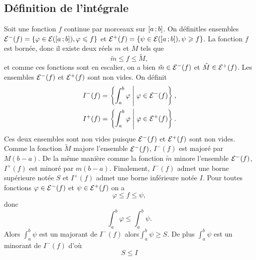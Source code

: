 \subsection{Définition de l'intégrale}

Soit une fonction \(f\) continue par morceaux sur \(\left[ a \, ;  b \right]\). On définitles ensembles \(\mathcal{E}^{-}(f)=\{\varphi \in \mathcal{E}(\left[ a \, ;  b \right]), \varphi \leqslant f\}\) et \(\mathcal{E}^{+}(f)=\{\psi \in \mathcal{E}(\left[ a \, ;  b \right]), \psi \geqslant f\}\). La fonction \(f\) est bornée, donc il existe deux réels \(m\) et \(M\) tels que 
\begin{equation}
  \tilde{m} \leqslant f \leqslant \tilde{M},
\end{equation}
et comme ces fonctions sont en escalier, on a bien \(\tilde{m} \in \mathcal{E}^{-}(f)\) et \(\tilde{M} \in \mathcal{E}^{+}(f)\). Les ensembles \(\mathcal{E}^{-}(f)\) et \(\mathcal{E}^{+}(f)\) sont non vides. On définit 
\begin{align}
I^{-}(f)=\left\{\int_a^b \varphi\mathrel{}\middle|\mathrel{}\varphi \in \mathcal{E}^{-}(f)\right\}, \\
I^{+}(f)=\left\{\int_a^b \varphi\mathrel{}\middle|\mathrel{}\varphi \in \mathcal{E}^{+}(f)\right\}.
\end{align}
 Ces deux ensembles sont non vides puisque \(\mathcal{E}^{-}(f)\) et \(\mathcal{E}^{+}(f)\) sont non vides. Comme la fonction \(\tilde{M}\) majore l'ensemble \(\mathcal{E}^{-}(f)\), \(I^{-}(f)\) est majoré par \(M(b-a)\). De la même manière comme la fonction \(\tilde{m}\) minore l'ensemble \(\mathcal{E}^{-}(f)\), \(I^{+}(f)\) est minoré par \(m(b-a)\). Finalement, \(I^{-}(f)\) admet une borne supérieure notée \(S\) et \(I^{+}(f)\) admet une borne inférieure notée \(I\). Pour toutes fonctions \(\varphi \in \mathcal{E}^{-}(f)\) et \(\psi \in \mathcal{E}^{+}(f)\) on a
\begin{equation}
  \varphi \leqslant f \leqslant \psi,
\end{equation}
donc
\begin{equation}
  \int_a^b \varphi \leqslant \int_a^b \psi.
\end{equation}
Alors \(\int_a^b \psi\) est un majorant de \(I^{-}(f)\) alors\(\int_a^b \psi \geqslant S\). De plus \(\int_a^b \psi\) est un minorant de \(I^{-}(f)\) d'où
\begin{equation}
  S \leqslant I
\end{equation}

